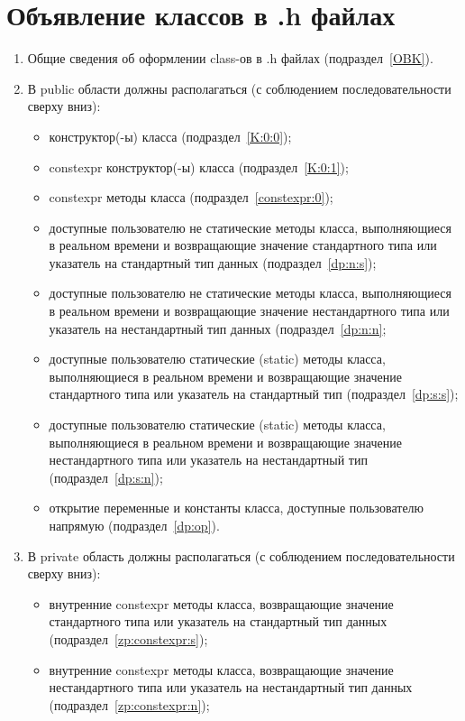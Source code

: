 \chapter{Объявление классов в .h файлах}\label{class:0}
\begin{enumerate}
	\item Общие сведения об оформлении class-ов в .h файлах (подраздел~\ref{OBK}).
	\item В public области должны располагаться (с соблюдением последовательности сверху вниз):\begin{itemize}
		\item конструктор(-ы) класса (подраздел~\ref{K:0:0});
		\item constexpr конструктор(-ы) класса (подраздел~\ref{K:0:1});
		\item constexpr методы класса (подраздел~\ref{constexpr:0});
		\item доступные пользователю не статические методы класса, выполняющиеся в реальном времени и возвращающие значение стандартного типа или указатель на стандартный тип данных (подраздел~\ref{dp:n:s});
		\item доступные пользователю не статические методы класса, выполняющиеся в реальном времени и возвращающие значение нестандартного типа или указатель на нестандартный тип данных (подраздел~\ref{dp:n:n};
		\item доступные пользователю статические (static) методы класса, выполняющиеся в реальном времени и возвращающие значение стандартного типа или указатель на стандартный тип (подраздел~\ref{dp:s:s});
		\item доступные пользователю статические (static) методы класса, выполняющиеся в реальном времени и возвращающие значение нестандартного типа или указатель на нестандартный тип (подраздел~\ref{dp:s:n});
		\item открытие переменные и константы класса, доступные пользователю напрямую (подраздел~\ref{dp:op}).
	\end{itemize}
	\item В private область должны располагаться (с соблюдением последовательности сверху вниз):\begin{itemize}
		\item внутренние constexpr методы класса, возвращающие значение стандартного типа или указатель на стандартный тип данных (подраздел~\ref{zp:constexpr:s});
		\item внутренние constexpr методы класса, возвращающие значение нестандартного типа или указатель на нестандартный тип данных (подраздел~\ref{zp:constexpr:n});

\end{itemize}
\end{enumerate}
